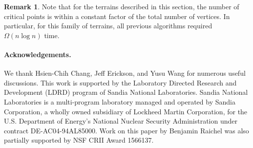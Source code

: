 \documentclass[11pt]{article}
\newcommand{\myparagraph}[1]{\paragraph{#1}}
\theoremstyle{definition}
\newtheorem{Remark}[theorem]{Remark}
\begin{document}
\begin{Remark}
 Note that for the terrains described in this section, the number of critical points is within a constant factor of 
 the total number of vertices.  In particular, for this family of terrains, all previous algorithms required $\Omega(n\log n)$ time.
\end{Remark}





\myparagraph{Acknowledgements.}
We thank Hsien-Chih Chang, Jeff Erickson, and Yusu Wang for numerous useful discussions. This work is
supported by the Laboratory Directed Research and Development
(LDRD) program of Sandia National Laboratories. Sandia National
Laboratories is a multi-program laboratory managed and operated
by Sandia Corporation, a wholly owned subsidiary of Lockheed
Martin Corporation, for the U.S. Department of Energy's National
Nuclear Security Administration under contract DE-AC04-94AL85000.
Work on this paper by Benjamin Raichel was also partially supported
by NSF CRII Award 1566137.






%
%
%
%
\end{document}
